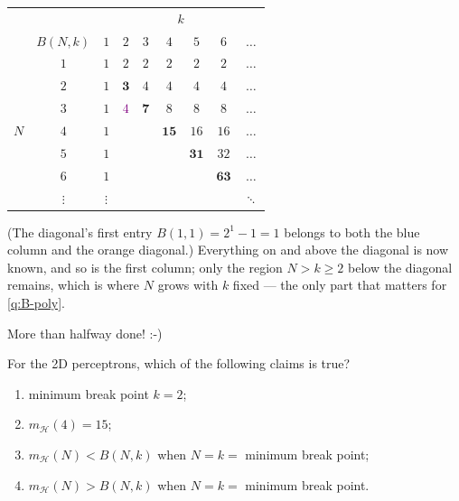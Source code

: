\begin{center}
    \solidrules
    \begin{tabular}{@{}cc|ccccccc@{}}
        \toprule
        & & \multicolumn{7}{c}{\(k\)}\\
        & \(B(N, k)\) & \(1\) & \(2\) & \(3\) & \(4\) & \(5\) & \(6\)
        & \(\dots\)\\
        \midrule
        & \(1\) & \textcolor{blue!75!black}{\(1\)} & \(2\) & \(2\) & \(2\)
        & \(2\) & \(2\) & \(\dots\)\\
        & \(2\) & \textcolor{blue!75!black}{\(1\)}
        & \textcolor{orange!85!black}{\(\bm{3}\)} & \(4\) & \(4\) & \(4\) & \(4\)
        & \(\dots\)\\
        & \(3\) & \textcolor{blue!75!black}{\(1\)} & \textcolor{Purple}{\(4\)}
        & \textcolor{orange!85!black}{\(\bm{7}\)} & \(8\) & \(8\) & \(8\)
        & \(\dots\)\\
        \(N\) & \(4\) & \textcolor{blue!75!black}{\(1\)} & &
        & \textcolor{orange!85!black}{\(\bm{15}\)} & \(16\) & \(16\)
        & \(\dots\)\\
        & \(5\) & \textcolor{blue!75!black}{\(1\)} & & &
        & \textcolor{orange!85!black}{\(\bm{31}\)} & \(32\) & \(\dots\)\\
        & \(6\) & \textcolor{blue!75!black}{\(1\)} & & & &
        & \textcolor{orange!85!black}{\(\bm{63}\)} & \(\dots\)\\
        & \(\vdots\) & \(\vdots\) & & & & & & \(\ddots\)\\
        \bottomrule
    \end{tabular}
\end{center}

(The diagonal's first entry \(B(1, 1) = 2^1 - 1 = 1\) belongs to both the
blue column and the orange diagonal.) Everything on and above the diagonal is
now known, and so is the first column; only the region \(N > k \ge 2\) below
the diagonal remains, which is where \(N\) grows with \(k\) fixed --- the only
part that matters for \autoref{q:B-poly}.

\begin{moral}
    More than halfway done! :-)
\end{moral}

\begin{exercise}
    For the 2D perceptrons, which of the following claims is true?
    \begin{enumerate}[(1)]
        \item minimum break point \(k = 2\);
        \item \(m_{\mathcal{H}}(4) = 15\);
        \item \(m_{\mathcal{H}}(N) < B(N, k)\) when \(N = k =\) minimum break
            point;
        \item \(m_{\mathcal{H}}(N) > B(N, k)\) when \(N = k =\) minimum break
            point.
    \end{enumerate}
\end{exercise}

